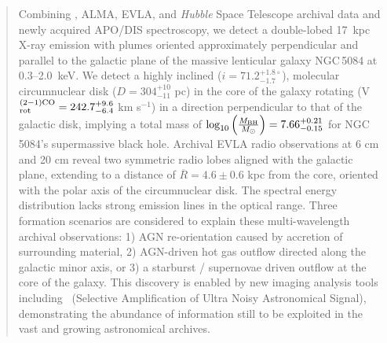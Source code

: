 \documentclass[modern]{aastex631}
\begin{document}




\begin{abstract}
Combining \Chandra, ALMA, EVLA, and \emph{Hubble} Space Telescope archival data  and newly acquired APO/DIS spectroscopy, we detect a double-lobed 17~kpc X-ray emission with plumes oriented approximately perpendicular and parallel to the galactic plane of the massive lenticular galaxy NGC\,5084 at 0.3--2.0~keV. 
We detect a highly inclined ($i=71.2^{+1.8\circ}_{-1.7}$), molecular circumnuclear disk ($D=304^{+10}_{-11}$ pc) in the core of the galaxy rotating (V$^{\rm (2-1) CO}_{\rm rot}=242.7^{+9.6}_{-6.4}$ km s$^{-1}$) in a direction 
perpendicular to that of the galactic disk, implying a total mass of $\log_{10}\left( \frac{M_{\rm BH}}{M_{\odot}} \right) = 7.66^{+0.21}_{-0.15}$ for NGC\,5084's supermassive black hole. Archival EVLA radio observations at 6 cm and 20 cm reveal two symmetric radio lobes aligned with the galactic plane, extending to a distance of $\overline{R}=4.6\pm0.6$ kpc from the core, oriented with the polar axis of the circumnuclear disk. The spectral energy distribution lacks strong emission lines in the optical range. 
Three formation scenarios are considered to explain these multi-wavelength archival observations: 1) AGN re-orientation caused by accretion of surrounding material, 2) AGN-driven hot gas outflow directed along the 
galactic minor axis, or 3) a starburst / supernovae driven outflow at the core of the galaxy. This discovery is enabled by new imaging analysis tools 
including \SAUNAS\ (Selective Amplification of Ultra Noisy Astronomical Signal), demonstrating the abundance of information still to be exploited in the vast and growing astronomical archives.
\end{abstract}

\keywords{}
\end{document}
